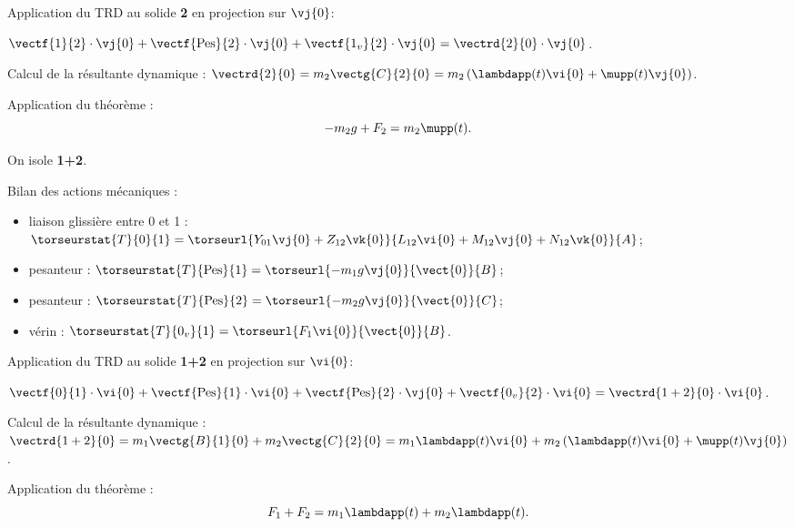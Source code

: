 Application du TRD au solide \textbf{2} en projection sur $\vj{0}$: 

$\vectf{1}{2}\cdot \vj{0} + \vectf{\text{Pes}}{2}\cdot \vj{0}+ \vectf{1_v}{2}\cdot \vj{0} = \vectrd{2}{0}\cdot \vj{0}$.

\vspace{.25cm}

Calcul de la résultante dynamique : 
$\vectrd{2}{0} = m_2 \vectg{C}{2}{0} = m_2 \left(\lambdapp (t) \vi{0}+\mupp (t) \vj{0}\right)$.

Application du théorème : 
$$
-m_2g  + F_2 = m_2\mupp (t).
$$
\else
\fi


\ifprof
On isole \textbf{1+2}. 

\vspace{.25cm}

Bilan des actions mécaniques : 
\begin{itemize}
\item liaison glissière entre 0 et 1 : 
$\torseurstat{T}{0}{1}= \torseurl{Y_{01}\vj{0}+Z_{12}\vk{0}}{L_{12}\vi{0}+M_{12}\vj{0}+N_{12}\vk{0}}{A}$;
\item pesanteur : $\torseurstat{T}{\text{Pes}}{1}= \torseurl{-m_1 g \vj{0}}{\vect{0}}{B}$;
\item pesanteur : $\torseurstat{T}{\text{Pes}}{2}= \torseurl{-m_2 g \vj{0}}{\vect{0}}{C}$;
\item vérin : $\torseurstat{T}{0_v}{1}= \torseurl{F_1 \vi{0}}{\vect{0}}{B}$.
\end{itemize}

\vspace{.25cm}

Application du TRD au solide \textbf{1+2} en projection sur $\vi{0}$: 

$\vectf{0}{1}\cdot \vi{0} + \vectf{\text{Pes}}{1}\cdot \vi{0}+ \vectf{\text{Pes}}{2}\cdot \vj{0}+ \vectf{0_v}{2}\cdot \vi{0} = \vectrd{1+2}{0}\cdot \vi{0}$.

\vspace{.25cm}

Calcul de la résultante dynamique : 
$\vectrd{1+2}{0} = m_1 \vectg{B}{1}{0}+m_2 \vectg{C}{2}{0} = m_1 \lambdapp (t) \vi{0} + m_2 \left(\lambdapp (t) \vi{0}+\mupp (t) \vj{0}\right)$.

Application du théorème : 
$$
F_1  + F_2 = m_1 \lambdapp (t)  + m_2 \lambdapp (t) .
$$

\else
\fi


\ifprof
\else


\fi